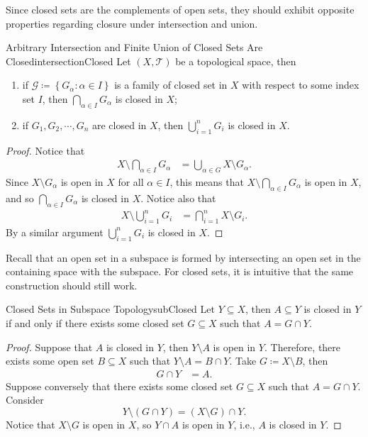 \documentclass[math]{amznotes}
\theoremstyle{remark}
\begin{document}
Since closed sets are the complements of open sets, they should exhibit opposite properties regarding closure under intersection and union.
\begin{probox}{\small Arbitrary Intersection and Finite Union of Closed Sets Are Closed}{intersectionClosed}
    Let $\left(X, \mathcal{T}\right)$ be a topological space, then 
    \begin{enumerate}
        \item if $\mathcal{G} \coloneqq \left\{G_{\alpha} \colon \alpha \in I\right\}$ is a family of closed set in $X$ with respect to some index set $I$, then $\bigcap_{\alpha \in I}G_{\alpha}$ is closed in $X$;
        \item if $G_1, G_2, \cdots, G_n$ are closed in $X$, then $\bigcup_{i = 1}^nG_i$ is closed in $X$.
    \end{enumerate}
    \tcblower
    \begin{proof}
        Notice that
        \begin{align*}
            X \setminus \bigcap_{\alpha \in I}G_{\alpha} & = \bigcup_{\alpha \in G} X \setminus G_{\alpha}.
        \end{align*}
        Since $X \setminus G_{\alpha}$ is open in $X$ for all $\alpha \in I$, this means that $X \setminus \bigcap_{\alpha \in I}G_{\alpha}$ is open in $X$, and so $\bigcap_{\alpha \in I}G_{\alpha}$ is closed in $X$. Notice also that 
        \begin{align*}
            X \setminus \bigcup_{i = 1}^nG_i & = \bigcap_{i = 1}^nX \setminus G_i.
        \end{align*}
        By a similar argument $\bigcup_{i = 1}^nG_i$ is closed in $X$.
    \end{proof}
\end{probox}
Recall that an open set in a subspace is formed by intersecting an open set in the containing space with the subspace. For closed sets, it is intuitive that the same construction should still work.
\begin{probox}{Closed Sets in Subspace Topology}{subClosed}
    Let $Y \subseteq X$, then $A \subseteq Y$ is closed in $Y$ if and only if there exists some closed set $G \subseteq X$ such that $A = G \cap Y$.
    \tcblower
    \begin{proof}
        Suppose that $A$ is closed in $Y$, then $Y \setminus A$ is open in $Y$. Therefore, there exists some open set $B \subseteq X$ such that $Y \setminus A = B \cap Y$. Take $G \coloneqq X \setminus B$, then 
        \begin{align*}
            G \cap Y & = A.
        \end{align*}
        Suppose conversely that there exists some closed set $G \subseteq X$ such that $A = G \cap Y$. Consider 
        \begin{equation*}
            Y \setminus \left(G \cap Y\right) = (X \setminus G) \cap Y.
        \end{equation*}
        Notice that $X \setminus G$ is open in $X$, so $Y \cap A$ is open in $Y$, i.e., $A$ is closed in $Y$.
    \end{proof}
\end{probox}
\end{document}
